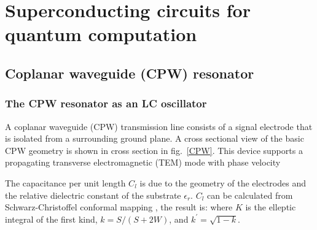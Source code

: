 \chapter{Superconducting circuits for quantum computation}
\label{ch:sc_circuits}

\section{Coplanar waveguide (CPW) resonator}
\subsection{The CPW resonator as an LC oscillator}
A coplanar waveguide (CPW) transmission line consists of a signal electrode that is isolated from a surrounding ground plane.
A cross sectional view of the basic CPW geometry is shown in cross section in fig.~\ref{CPW}.
This device supports a propagating transverse electromagnetic (TEM) mode  with phase velocity \cite{Pozar}

The capacitance per unit length $C_l$ is due to the geometry of the electrodes and the relative dielectric constant of the substrate $\epsilon_r$.
$C_l$ can be calculated from Schwarz-Christoffel conformal mapping \cite{GaoThesis}, the result is:
where $K$ is the elleptic integral of the first kind, $k = S/ \left( S + 2W \right)$, and $k^\prime = \sqrt{1 - k}$.

